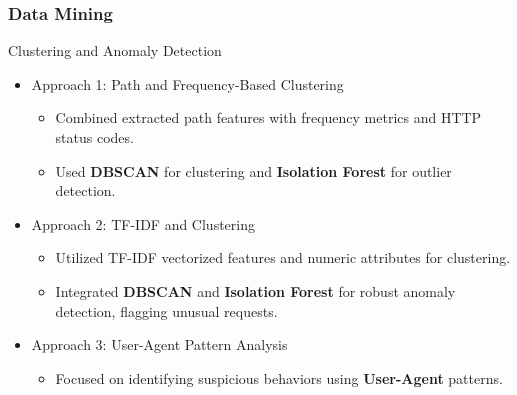 \documentclass[10pt, a4paper]{beamer}
\begin{document}
	\begin{frame}
		\frametitle{Data Mining}
		
		\begin{block}{Clustering and Anomaly Detection}
			
			\begin{itemize}
				\item Approach 1: Path and Frequency-Based Clustering
				\begin{itemize}
					\item Combined extracted path features with frequency metrics and HTTP status codes.
					\item Used \textbf{DBSCAN} for clustering and \textbf{Isolation Forest} for outlier detection.
				\end{itemize}
				\item Approach 2: TF-IDF and Clustering
				\begin{itemize}
					\item Utilized TF-IDF vectorized features and numeric attributes for clustering.
					\item Integrated \textbf{DBSCAN} and \textbf{Isolation Forest} for robust anomaly detection, flagging unusual requests.
				\end{itemize}
				
				\item Approach 3: User-Agent Pattern Analysis
				\begin{itemize}
					\item Focused on identifying suspicious behaviors using \textbf{User-Agent} patterns.
				\end{itemize}
			\end{itemize}
		\end{block}
		
	\end{frame}
	
\end{document}
